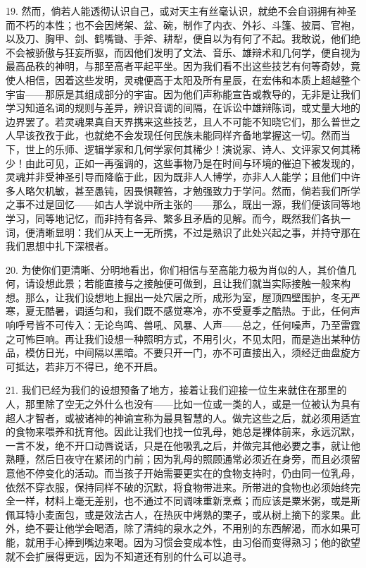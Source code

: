 19. 然而，倘若人能透彻认识自己，或对天主有丝毫认识，就绝不会自诩拥有神圣而不朽的本性；也不会因烤架、盆、碗，制作了内衣、外衫、斗篷、披肩、官袍，以及刀、胸甲、剑、鹤嘴锄、手斧、耕犁，便自以为有何了不起。我敢说，他们绝不会被骄傲与狂妄所驱，而因他们发明了文法、音乐、雄辩术和几何学，便自视为最高品秩的神明，与那至高者平起平坐。因为我们看不出这些技艺有何等奇妙，竟使人相信，因着这些发明，灵魂便高于太阳及所有星辰，在宏伟和本质上超越整个宇宙——那原是其组成部分的宇宙。因为他们声称能宣告或教导的，无非是让我们学习知道名词的规则与差异，辨识音调的间隔，在诉讼中雄辩陈词，或丈量大地的边界罢了。若灵魂果真自天界携来这些技艺，且人不可能不知晓它们，那么普世之人早该孜孜于此，也就绝不会发现任何民族未能同样齐备地掌握这一切。然而当下，世上的乐师、逻辑学家和几何学家何其稀少！演说家、诗人、文评家又何其稀少！由此可见，正如一再强调的，这些事物乃是在时间与环境的催迫下被发现的，灵魂并非受神圣引导而降临于此，因为既非人人博学，亦非人人能学；且他们中许多人略欠机敏，甚至愚钝，因畏惧鞭笞，才勉强致力于学问。然而，倘若我们所学之事不过是回忆——如古人学说中所主张的——那么，既出一源，我们便该同等地学习，同等地记忆，而非持有各异、繁多且矛盾的见解。而今，既然我们各执一词，便清晰显明：我们从天上一无所携，不过是熟识了此处兴起之事，并持守那在我们思想中扎下深根者。\par

20. 为使你们更清晰、分明地看出，你们相信与至高能力极为肖似的人，其价值几何，请设想此景；若能直接与之接触便可做到，且让我们就当实际接触一般来构想。那么，让我们设想地上掘出一处穴居之所，成形为室，屋顶四壁围护，冬无严寒，夏无酷暑，调适匀和，我们既不感觉寒冷，亦不受夏季之酷热。于此，任何声响呼号皆不可传入：无论鸟鸣、兽吼、风暴、人声——总之，任何噪声，乃至雷霆之可怖巨响。再让我们设想一种照明方式，不用引火，不见太阳，而是造出某种仿品，模仿日光，中间隔以黑暗。不要只开一门，亦不可直接出入，须经迂曲盘旋方可抵达，若非万不得已，绝不开启。\par

21. 我们已经为我们的设想预备了地方，接着让我们迎接一位生来就住在那里的人，那里除了空无之外什么也没有——比如一位或一类的人，或是一位被认为具有超人才智者，或被诸神的神谕宣称为最具智慧的人。做完这些之后，就必须用适宜的食物来喂养和抚育他。因此让我们也找一位乳母，她总是裸体前来，永远沉默，一言不发，绝不开口动唇说话，只是在他吸乳之后，并做完其他必要之事，就让他熟睡，然后日夜守在紧闭的门前；因为乳母的照顾通常必须近在身旁，而且必须留意他不停变化的活动。而当孩子开始需要更实在的食物支持时，仍由同一位乳母，依然不穿衣服，保持同样不破的沉默，将食物带进来。所带进的食物也必须始终完全一样，材料上毫无差别，也不通过不同调味重新烹煮；而应该是粟米粥，或是斯佩耳特小麦面包，或是效法古人，在热灰中烤熟的栗子，或从树上摘下的浆果。此外，绝不要让他学会喝酒，除了清纯的泉水之外，不用别的东西解渴，而水如果可能，就用手心捧到嘴边来喝。因为习惯会变成本性，由习俗而变得熟习；他的欲望就不会扩展得更远，因为不知道还有别的什么可以追寻。\par

